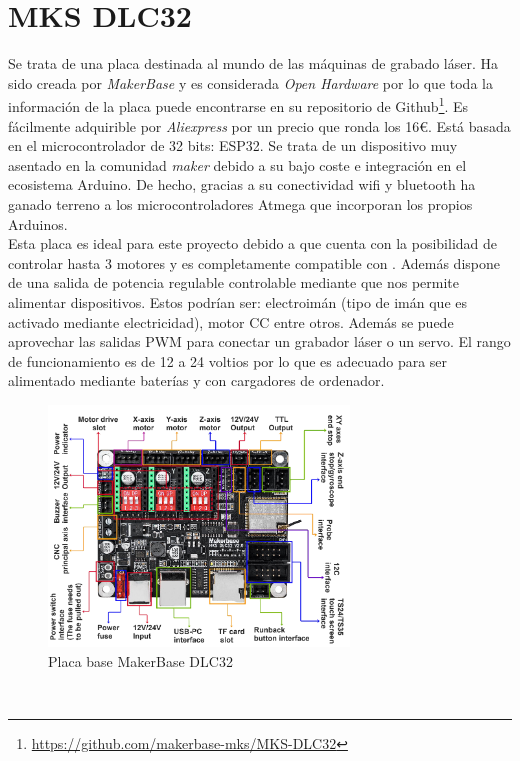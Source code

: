 \section{MKS DLC32}
\label{subsec:mksdlc32}
Se trata de una placa destinada al mundo de las máquinas de grabado láser. Ha sido creada por \textit{MakerBase} y es considerada 
\textit{Open Hardware} por lo que toda la información de la placa puede encontrarse en su repositorio de Github\footnote{\url{https://github.com/makerbase-mks/MKS-DLC32}}.
Es fácilmente adquirible por \textit{Aliexpress} por un precio que ronda los 16\euro. Está basada en el microcontrolador de 32 bits: ESP32. 
Se trata de un dispositivo muy asentado en la comunidad \textit{maker} debido a su bajo coste e integración en el 
ecosistema Arduino. De hecho, gracias a su conectividad wifi y bluetooth ha ganado terreno a los microcontroladores Atmega que incorporan los propios Arduinos.\\
Esta placa es ideal para este proyecto debido a que cuenta con la posibilidad de controlar 
hasta 3 motores y es completamente compatible con . Además dispone de una salida de potencia regulable controlable mediante  que nos 
permite alimentar dispositivos. Estos podrían ser: electroimán (tipo de imán que es activado mediante electricidad), motor \ac{CC} entre otros. Además se puede aprovechar las salidas \ac{PWM} para conectar un grabador láser o un servo. 
El rango de funcionamiento es de 12 a 24 voltios por lo que es adecuado para ser alimentado mediante baterías y con cargadores de ordenador. 
\begin{figure} [h!]
    \begin{center}
      \includegraphics[width=8cm]{figs/MKS.png}
    \end{center}
    \caption{Placa base MakerBase DLC32}
    \label{fig:robSoldering}
  \end{figure}\ 

